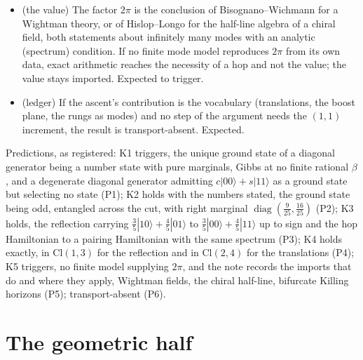 \documentclass[11pt]{article}
\theoremstyle{definition}
\theoremstyle{plain}
\providecommand{\Cl}{}\renewcommand{\Cl}{\mathrm{Cl}}
\providecommand{\ket}{}\renewcommand{\ket}[1]{|#1\rangle}
\begin{document}
\begin{itemize}
\item[K5] (the value) The factor $2\pi$ is the conclusion of Bisognano--Wichmann for a Wightman theory, or of Hislop--Longo for the half-line algebra of a chiral field, both statements about infinitely many modes with an analytic (spectrum) condition. If no finite mode model reproduces $2\pi$ from its own data, exact arithmetic reaches the necessity of a hop and not the value; the value stays imported. Expected to trigger.
\item[K6] (ledger) If the ascent's contribution is the vocabulary (translations, the boost plane, the rungs as modes) and no step of the argument needs the $(1,1)$ increment, the result is transport-absent. Expected.
\end{itemize}
Predictions, as registered: K1 triggers, the unique ground state of a diagonal generator being a number state with pure marginals, Gibbs at no finite rational $\beta$, and a degenerate diagonal generator admitting $c\ket{00} + s\ket{11}$ as a ground state but selecting no state (P1); K2 holds with the numbers stated, the ground state being odd, entangled across the cut, with right marginal $\operatorname{diag}(\tfrac{9}{25}, \tfrac{16}{25})$ (P2); K3 holds, the reflection carrying $\tfrac35\ket{10} + \tfrac45\ket{01}$ to $\tfrac35\ket{00} + \tfrac45\ket{11}$ up to sign and the hop Hamiltonian to a pairing Hamiltonian with the same spectrum (P3); K4 holds exactly, in $\Cl(1,3)$ for the reflection and in $\Cl(2,4)$ for the translations (P4); K5 triggers, no finite model supplying $2\pi$, and the note records the imports that do and where they apply, Wightman fields, the chiral half-line, bifurcate Killing horizons (P5); transport-absent (P6).

\section{The geometric half}
\end{document}

